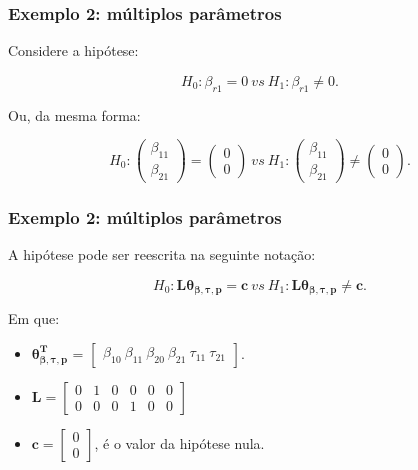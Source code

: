 \documentclass[10pt,
  aspectratio=169,
  serif,
  mathserif,
  professionalfont,
  compress,
  handout,
  ]{beamer}\usepackage[]{graphicx}\usepackage[]{color}
\begin{document}

\begin{frame}

\frametitle{Exemplo 2: múltiplos parâmetros}

Considere a hipótese:

$$H_0: \beta_{r1} = 0 \ vs \ H_1: \beta_{r1} \neq 0.$$ 

Ou, da mesma forma:

$$H_0: 
\begin{pmatrix}
\beta_{11} \\ 
\beta_{21}
\end{pmatrix} 
= 
\begin{pmatrix}
0 \\ 
0
\end{pmatrix}
\ vs \ 
H_1: 
\begin{pmatrix}
\beta_{11} \\ 
\beta_{21}
\end{pmatrix} 
\neq
\begin{pmatrix}
0 \\ 
0 
\end{pmatrix}.$$

\end{frame}


\begin{frame}

\frametitle{Exemplo 2: múltiplos parâmetros}

A hipótese pode ser reescrita na seguinte notação:

$$H_0: \boldsymbol{L}\boldsymbol{\theta_{\beta,\tau,p}} = \boldsymbol{c} \ vs \ H_1: \boldsymbol{L}\boldsymbol{\theta_{\beta,\tau,p}} \neq \boldsymbol{c}.$$ 

Em que:

\begin{itemize}
  
  \item $\boldsymbol{\theta_{\beta,\tau,p}^T}$ = $\begin{bmatrix} \beta_{10} \  \beta_{11} \ \beta_{20} \ \beta_{21} \ \tau_{11} \ \tau_{21} \end{bmatrix}$.


\item $\boldsymbol{L} = \begin{bmatrix} 0 & 1 & 0 & 0 & 0 & 0 \\
0 & 0 & 0 & 1 & 0 & 0 \end{bmatrix}$
 
\item $\boldsymbol{c} = \begin{bmatrix} 0 \\ 0 \end{bmatrix}$, é o valor da hipótese nula. 

\end{itemize}

\end{frame}
\end{document}
